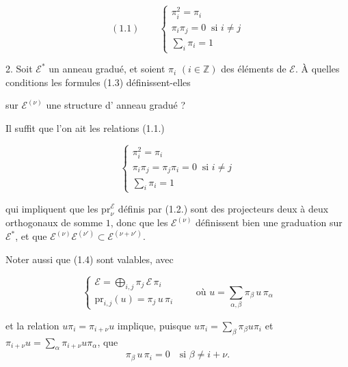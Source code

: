 \documentclass[11pt,a4paper]{article}
\begin{document}

\[ (1.1) \qquad \begin{cases} \pi_{i}^{2} = \pi_{i} \\ \pi_{i} \pi_{j} = 0 \ \text{ si } i \neq j \\ \sum_{i} \pi_{i} = 1 \end{cases} \]

2. Soit $\mathcal{E}^{*}$ un  anneau gradué, et soient
$\pi_{i}$ $(i \in \mathbb{Z})$  des éléments de
$\mathcal{E}$. À quelles conditions les formules (1.3) définissent-elles


sur $\mathcal{E}^{(\nu)}$ une structure d' anneau gradué ?

Il suffit que l'on ait les relations (1.1.)

\[ \begin{cases} \pi_{i}^{2} = \pi_{i} \\ \pi_{i} \pi_{j} = \pi_{j} \pi_{i} = 0 \ \text{ si } i \neq j \\ \sum_{i} \pi_{i} = 1 \end{cases} \]

qui impliquent que les $\mathrm{pr}_{\nu}^{\mathcal{E}}$ définis par (1.2.) sont
des projecteurs deux à deux orthogonaux de somme $1$, donc que les
$\mathcal{E}^{(\nu)}$ définissent bien une graduation  sur
$\mathcal{E}^{*}$,  et que
$\mathcal{E}^{(\nu)} \mathcal{E}^{(\nu')} \subset \mathcal{E}^{(\nu + \nu')}$.


Noter aussi que (1.4) sont valables,  avec \ill{}
 

\[ \begin{cases} \mathcal{E} = \bigoplus_{i,j} \pi_{j}\, \mathcal{E}\, \pi_{i} \\ \mathrm{pr}_{i,j}(u) = \pi_{j}\, u\, \pi_{i} \end{cases} \qquad \text{où } u = \sum_{\alpha,\beta} \pi_{\beta}\, u\, \pi_{\alpha} \]

et la relation $u \pi_{i} = \pi_{i+\nu} u$ implique, puisque
$u \pi_{i} = \sum_{\beta} \pi_{\beta} u \pi_{i}$ et
$\pi_{i+\nu} u = \sum_{\alpha} \pi_{i+\nu} u \pi_{\alpha}$, que
\[ \pi_{\beta}\, u\, \pi_{i} = 0 \quad \text{si } \beta \neq i + \nu . \]
\end{document}
